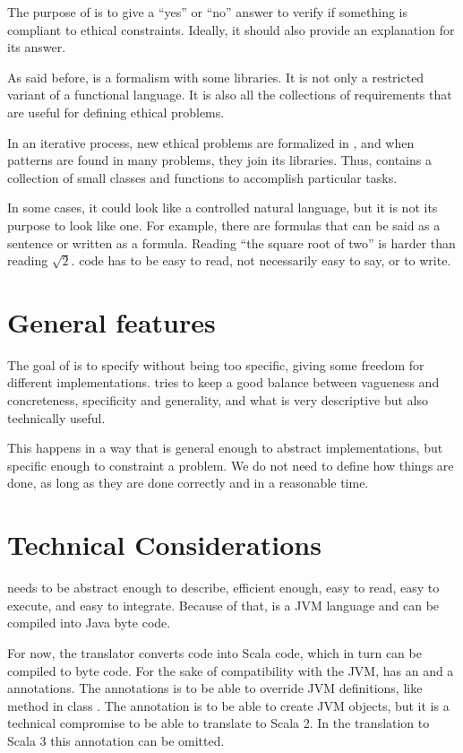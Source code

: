 The purpose of \Soda is to give a ``yes'' or ``no'' answer to verify if something is compliant to ethical constraints.
Ideally, it should also provide an explanation for its answer.

As said before, \Soda is a formalism with some libraries.
It is not only a restricted variant of a functional language.
It is also all the collections of requirements that are useful for defining ethical problems.

In an iterative process, new ethical problems are formalized in \Soda, and when patterns are found in many problems, they join its libraries.
Thus, \Soda contains a collection of small classes and functions to accomplish particular tasks.

In some cases, it could look like a controlled natural language, but it is not its purpose to look like one.
For example, there are formulas that can be said as a sentence or written as a formula.
Reading ``the square root of two'' is harder than reading $\sqrt{2}$.
\Soda code has to be easy to read, not necessarily easy to say, or to write.


\section{General features}

The goal of \Soda is to specify without being too specific, giving some freedom for different implementations.
\Soda tries to keep a good balance between vagueness and concreteness, specificity and generality,
and what is very descriptive but also technically useful.

This happens in a way that is general enough to abstract implementations, but specific enough to constraint a problem.
We do not need to define how things are done, as long as they are done correctly and in a reasonable time.


\section{Technical Considerations}

\Soda needs to be abstract enough to describe, efficient enough, easy to read, easy to execute, and easy to integrate.
Because of that, \Soda is a JVM language and can be compiled into Java byte code.

For now, the translator converts \Soda code into Scala code, which in turn can be compiled to byte code.
For the sake of compatibility with the JVM, \Soda has an \soverride and a \snew annotations.
The \soverride annotations is to be able to override JVM definitions, like method  in class .
The \snew annotation is to be able to create JVM objects, but it is a technical compromise to be able to translate to Scala 2.
In the translation to Scala 3 this annotation can be omitted.

